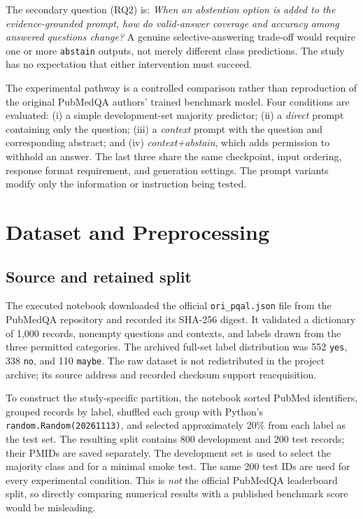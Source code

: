 \documentclass[conference]{IEEEtran}
\begin{document}
The secondary question (RQ2) is: \emph{When an abstention option is added to the evidence-grounded prompt, how do valid-answer coverage and accuracy among answered questions change?} A genuine selective-answering trade-off would require one or more \texttt{abstain} outputs, not merely different class predictions. The study has no expectation that either intervention must succeed.

The experimental pathway is a controlled comparison rather than reproduction of the original PubMedQA authors' trained benchmark model. Four conditions are evaluated: (i) a simple development-set majority predictor; (ii) a \emph{direct} prompt containing only the question; (iii) a \emph{context} prompt with the question and corresponding abstract; and (iv) \emph{context+abstain}, which adds permission to withhold an answer. The last three share the same checkpoint, input ordering, response format requirement, and generation settings. The prompt variants modify only the information or instruction being tested.

\section{Dataset and Preprocessing}
\subsection{Source and retained split}
The executed notebook downloaded the official \texttt{ori\_pqal.json} file from the PubMedQA repository and recorded its SHA-256 digest. It validated a dictionary of 1,000 records, nonempty questions and contexts, and labels drawn from the three permitted categories. The archived full-set label distribution was 552 \texttt{yes}, 338 \texttt{no}, and 110 \texttt{maybe}. The raw dataset is not redistributed in the project archive; its source address and recorded checksum support reacquisition.

To construct the study-specific partition, the notebook sorted PubMed identifiers, grouped records by label, shuffled each group with Python's \texttt{random.Random(20261113)}, and selected approximately 20\% from each label as the test set. The resulting split contains 800 development and 200 test records; their PMIDs are saved separately. The development set is used to select the majority class and for a minimal smoke test. The same 200 test IDs are used for every experimental condition. This is \emph{not} the official PubMedQA leaderboard split, so directly comparing numerical results with a published benchmark score would be misleading.
\end{document}
